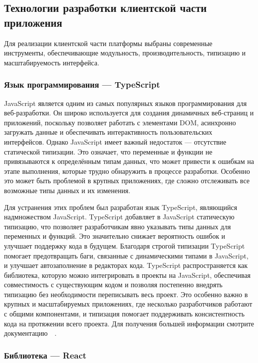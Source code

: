\subsection{Технологии разработки клиентской части приложения}

Для реализации клиентской части платформы выбраны современные инструменты, обеспечивающие модульность, производительность, типизацию и масштабируемость интерфейса.

\subsubsection{Язык программирования — TypeScript}

JavaScript является одним из самых популярных языков программирования для веб-разработки. Он широко используется для создания динамичных веб-страниц и приложений, поскольку позволяет работать с элементами DOM, асинхронно загружать данные и обеспечивать интерактивность пользовательских интерфейсов. Однако JavaScript имеет важный недостаток — отсутствие статической типизации. Это означает, что переменные и функции не привязываются к определённым типам данных, что может привести к ошибкам на этапе выполнения, которые трудно обнаружить в процессе разработки. Особенно это может быть проблемой в крупных приложениях, где сложно отслеживать все возможные типы данных и их изменения.

Для устранения этих проблем был разработан язык TypeScript, являющийся надмножеством JavaScript. TypeScript добавляет в JavaScript статическую типизацию, что позволяет разработчикам явно указывать типы данных для переменных и функций. Это значительно снижает вероятность ошибок и улучшает поддержку кода в будущем. Благодаря строгой типизации TypeScript помогает предотвращать баги, связанные с динамическими типами в JavaScript, и улучшает автозаполнение в редакторах кода. TypeScript распространяется как библиотека, которую можно интегрировать в проекты на JavaScript, обеспечивая совместимость с существующим кодом и позволяя постепенно внедрять типизацию без необходимости переписывать весь проект. Это особенно важно в крупных и масштабируемых приложениях, где несколько разработчиков работают с общими компонентами, и типизация помогает поддерживать консистентность кода на протяжении всего проекта. Для получения большей информации смотрите документацию~~\cite{typescript_handbook}.

\subsubsection{Библиотека — React}

